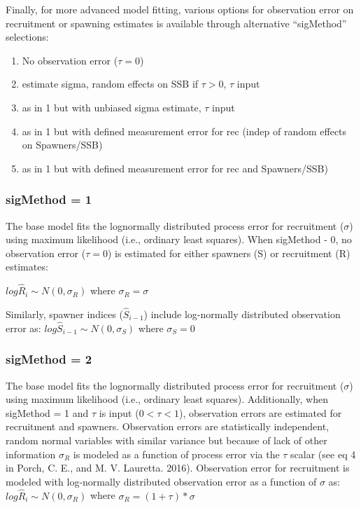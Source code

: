 \documentclass[
]{article}
\providecommand{\tightlist}{%
  \setlength{\itemsep}{0pt}\setlength{\parskip}{0pt}}
\begin{document}
Finally, for more advanced model fitting, various options for
observation error on recruitment or spawning estimates is available
through alternative ``sigMethod'' selections:

\begin{enumerate}
\def\labelenumi{\arabic{enumi}.}
\tightlist
\item
  No observation error (\(\tau=0\))
\item
  estimate sigma, random effects on SSB if \(\tau>0\), \(\tau\) input
\item
  as in 1 but with unbiased sigma estimate, \(\tau\) input
\item
  as in 1 but with defined measurement error for rec (indep of random
  effects on Spawners/SSB)
\item
  as in 1 but with defined measurement error for rec and Spawners/SSB)
\end{enumerate}

\hypertarget{sigmethod-1}{%
\subsubsection{sigMethod = 1}\label{sigmethod-1}}

The base model fits the lognormally distributed process error for
recruitment (\(\sigma\)) using maximum likelihood (i.e., ordinary least
squares). When sigMethod - 0, no observation error (\(\tau = 0\)) is
estimated for either spawners (S) or recruitment (R) estimates:

\(log\hat{R}_i\sim N(0,\sigma_R)\) where \(\sigma_R=\sigma\)

Similarly, spawner indices (\(\hat{S}_{i-1}\)) include log-normally
distributed observation error as:
\(log\hat{S}_{i-1} \sim N(0,\sigma_S)\) where \(\sigma_S=0\)

\hypertarget{sigmethod-2}{%
\subsubsection{sigMethod = 2}\label{sigmethod-2}}

The base model fits the lognormally distributed process error for
recruitment (\(\sigma\)) using maximum likelihood (i.e., ordinary least
squares). Additionally, when sigMethod = 1 and \(\tau\) is input
(\(0<\tau<1\)), observation errors are estimated for recruitment and
spawners. Observation errors are statistically independent, random
normal variables with similar variance but because of lack of other
information \(\sigma_R\) is modeled as a function of process error via
the \(\tau\) scalar (see eq 4 in Porch, C. E., and M. V. Lauretta.
2016). Observation error for recruitment is modeled with log-normally
distributed observation error as a function of \(\sigma\) as:
\(log\hat{R}_i\sim N(0,\sigma_R)\) where \(\sigma_R=(1+\tau)*\sigma\)
\end{document}
